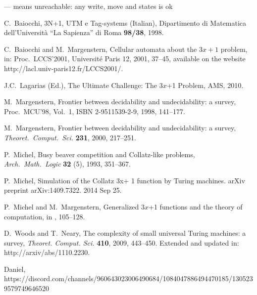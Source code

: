 \documentclass[10pt]{article}
\begin{document}
--- means unreachable: any write, move and states is ok

\begin{thebibliography}{99}
 C.\ Baiocchi, 3N+1, UTM e Tag-systems (Italian),
Dipartimento di Matematica dell'Universit\`a ``La Sapienza'' di Roma {\bf 98/38}, 1998.

 C.\ Baiocchi and M.\ Margenstern, Cellular automata about
the $3x + 1$ problem, in: Proc.\ LCCS'2001, Universit\'e Paris 12, 2001, 37--45,
available on the website http://lacl.univ-paris12.fr/LCCS2001/.

 J.C.\ Lagarias (Ed.), The Ultimate Challenge: The 3$x$+1 Problem, AMS, 2010.

 M.\ Margenstern, Frontier between decidability and undecidability: a survey,
Proc.\ MCU'98, Vol.\ 1, ISBN 2-9511539-2-9, 1998, 141--177.

 M.\ Margenstern, Frontier between decidability and undecidability:
a survey, \emph{Theoret.\ Comput.\ Sci.} {\bf 231}, 2000, 217--251.

 P.\ Michel, Busy beaver competition and Collatz-like problems,
\emph{Arch.\ Math.\ Logic} {\bf 32} (5), 1993, 351--367.

 P.\ Michel, Simulation of the Collatz 3x+ 1 function by Turing machines. arXiv preprint arXiv:1409.7322. 2014 Sep 25.

 P.\ Michel and M.\ Margenstern, Generalized 3$x$+1 functions and the theory of computation,
in \cite{La10}, 105--128.

 D.\ Woods and T.\ Neary, The complexity of small universal Turing machines:
a survey, \emph{Theoret. Comput. Sci.} {\bf 410}, 2009, 443--450.
Extended and updated in: http://arxiv/abs/1110.2230.

 Daniel, https://discord.com/channels/960643023006490684/1084047886494470185/1305239579749646520

\end{thebibliography}
\end{document}
